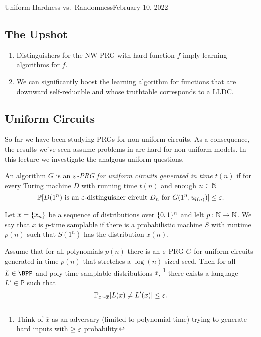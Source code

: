 \begin{lecture}{4}{Uniform Hardness vs.\ Randomness}{February 10, 2022}
\label{lec:04}

\subsection*{The Upshot}

\begin{enumerate}
  \item Distinguishers for the NW-PRG with hard function $f$ imply learning
    algorithms for $f$.
  \item We can significantly boost the learning algorithm for functions that
    are downward self-reducible and whose truthtable corresponds to a LLDC.
\end{enumerate}


\subsection{Uniform Circuits}

So far we have been studying PRGs for non-uniform circuits. As a consequence,
the results we've seen assume problems in \E are hard for non-uniform models.
In this lecture we investigate the analgous uniform questions.

\begin{definition}
  An algorithm $G$ is an \emph{$\varepsilon$-PRG for uniform circuits generated in
  time $t(n)$} if for every Turing machine $D$ with running time $t(n)$ and
  enough $n \in \mathbb{N}$
	\[
		\mathbb{P}[D(1^n) \text{ is an $\varepsilon$-distinguisher circuit }
    D_n \text{ for } G(1^n, u_{l(n)})] \leq \varepsilon.
	\]
\end{definition}

\begin{definition}
  Let $\overline{x} = \{\overline{x}_n\}$ be a sequence of distributions over
  $\{0, 1\}^n$ and lelt $p : \mathbb{N} \to \mathbb{N}$. We say that $\overline{x}$ is
  $p$-time samplable if there is a probabilistic machine $S$ with runtime
  $p(n)$ such that $S(1^n)$ has the distribution $\overline{x}(n)$.
\end{definition}

\begin{theorem}
  Assume that for all polynomials $p(n)$ there is an $\varepsilon$-PRG $G$ for uniform
  circuits generated in time $p(n)$ that stretches a $\log(n)$-sized seed. Then
  for all $L \in \BPP$ and poly-time samplable distributions $\overline{x}$,%
  \footnote{Think of $\overline{x}$ as an adversary (limited to polynomial
  time) trying to generate hard inputs with $\geq \varepsilon$ probability.} there
  exists a language $L' \in \textsf{P}$ such that
	\[
		\mathbb{P}_{x \sim \overline{x}}[L(x) \neq L'(x)] \leq \varepsilon.
	\]
\end{theorem}


\end{lecture}
